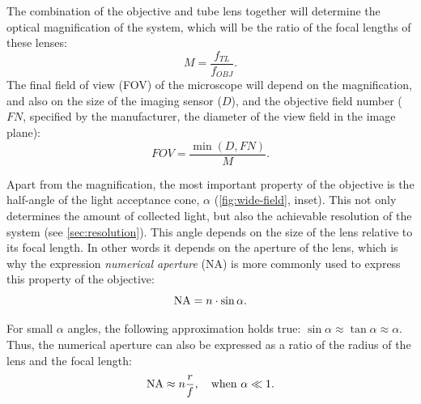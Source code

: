     The combination of the objective and tube lens together will determine the optical magnification of the system, which will be the ratio of the focal lengths of these lenses:
    \begin{equation}
      M = \frac{f_{TL}}{f_{OBJ}}.
      \label{eq:magnification}
    \end{equation}
    The final field of view (FOV) of the microscope will depend on the magnification, and also on the size of the imaging sensor ($D$), and the objective field number ($FN$, specified by the manufacturer, the diameter of the view field in the image plane):
    \begin{equation}
      FOV = \frac{\min(D, FN)}{M}.
      \label{eq:FOV}
    \end{equation}

    Apart from the magnification, the most important property of the objective is the half-angle of the light acceptance cone, $\alpha$ (\autoref{fig:wide-field}, inset). This not only determines the amount of collected light, but also the achievable resolution of the system (see \autoref{sec:resolution}). This angle depends on the size of the lens relative to its focal length. In other words it depends on the aperture of the lens, which is why the expression \textit{numerical aperture} (NA) is more commonly used to express this property of the objective:
    \begin{equation}
      \operatorname{NA} = n\cdot \sin \alpha.
      \label{eq:NA}
    \end{equation}

    For small $\alpha$ angles, the following approximation holds true: $\sin \alpha \approx \tan \alpha \approx \alpha$. Thus, the numerical aperture can also be expressed as a ratio of the radius of the lens and the focal length:
    \begin{equation}
      \operatorname{NA} \approx n \frac{r}{f},\quad \text{when }\alpha \ll 1.
    \end{equation}



